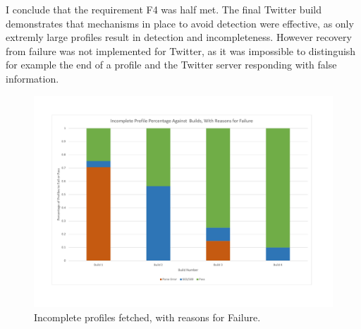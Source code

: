 I conclude that the requirement F4 was half met. The final Twitter build demonstrates that mechanisms in place to avoid detection were effective, as only extremly large profiles result in detection and incompleteness. However recovery from failure was not implemented for Twitter, as it was impossible to distinguish for example the end of a profile and the Twitter server responding with false information. 


\begin{center}
\begin{figure}[h!]
\centering
\includegraphics[width=500px]{Images/failure_rate_and_reason.pdf}
\caption{Incomplete profiles fetched, with reasons for Failure.}
\end{figure}
\end{center}



